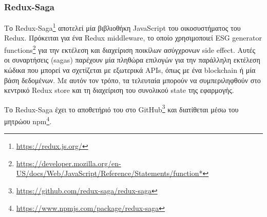 \subsubsection{Redux-Saga} \label{subsection:4-2-2-3-redux-saga}


Το Redux-Saga\footnote{\url{https://redux.js.org/}} αποτελεί μία βιβλιοθήκη JavaScript του οικοσυστήματος του Redux. Πρόκειται για ένα Redux middleware, το οποίο χρησιμοποιεί ESG generator functions\footnote{\url{https://developer.mozilla.org/en-US/docs/Web/JavaScript/Reference/Statements/function*}} για την εκτέλεση και διαχείριση ποικίλων ασύγχρονων side effect. Αυτές οι συναρτήσεις (sagas) παρέχουν μία πληθώρα επιλογών για την παράλληλη εκτέλεση κώδικα που μπορεί να σχετίζεται με εξωτερικά APIs, όπως με ένα blockchain ή μία βάση δεδομένων. Με αυτόν τον τρόπο, τα τελευταία μπορούν να συμπεριληφθούν στο κεντρικό Redux store και τη διαχείριση του συνολικού state της εφαρμογής.

Το Redux-Saga έχει το αποθετήριό του στο GitHub\footnote{\url{https://github.com/redux-saga/redux-saga}} και διατίθεται μέσω του μητρώου npm\footnote{\url{https://www.npmjs.com/package/redux-saga}}.
